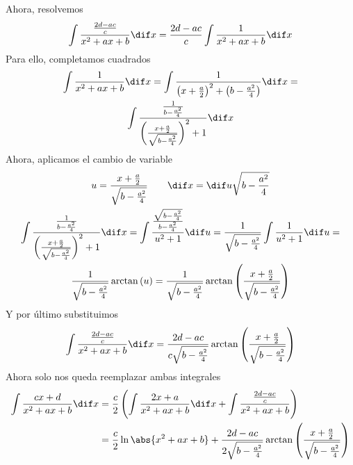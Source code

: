 \documentclass[a4paper]{article}
\begin{document}
Ahora, resolvemos
\[
    \int \frac{\frac{2d-ac}{c}}{x^2+ax+b} \dif x = \frac{2d-ac}{c} \int \frac{1}{x^2+ax+b} \dif x 
\]
Para ello, completamos cuadrados
\begin{gather*}
    \int \frac{1}{x^2+ax+b} \dif x = \int \frac{1}{\left( x + \frac{a}{2} \right)^2 + \left( b - \frac{a^2}{4} \right)} \dif x =\\
    \int \frac{\frac{1}{b - \frac{a^2}{4}}}{ \left( \frac{x + \frac{a}{2}}{ \sqrt{b - \frac{a^2}{4}}} \right)^2 + 1} \dif x
\end{gather*}
Ahora, aplicamos el cambio de variable
\begin{gather*}
    u = \frac{x + \frac{a}{2}}{\sqrt{b - \frac{a^2}{4}}} \qquad \dif x = \dif u \sqrt{b - \frac{a^2}{4}} \\
    \int \frac{\frac{1}{b - \frac{a^2}{4}}}{ \left( \frac{x + \frac{a}{2}}{ \sqrt{b - \frac{a^2}{4}}} \right)^2 + 1} \dif x = 
    \int \frac{\frac{\sqrt{b - \frac{a^2}{4}}}{b - \frac{a^2}{4}}}{u^2 + 1} \dif u = \frac{1}{\sqrt{b - \frac{a^2}{4}}} \int \frac{1}{u^2 + 1} \dif u = \\
    \frac{1}{\sqrt{b - \frac{a^2}{4}}} \arctan \left( u \right) = \frac{1}{\sqrt{b - \frac{a^2}{4}}} \arctan \left( \frac{x + \frac{a}{2}}{\sqrt{b - \frac{a^2}{4}}} \right)
\end{gather*}
Y por último substituimos
\[
    \int \frac{\frac{2d-ac}{c}}{x^2+ax+b} \dif x = \frac{2d-ac}{c\sqrt{b - \frac{a^2}{4}}} \arctan \left( \frac{x + \frac{a}{2}}{\sqrt{b - \frac{a^2}{4}}} \right)
\]
Ahora solo nos queda reemplazar ambas integrales
\[
\begin{aligned}
    \int \frac{cx+d}{x^2+ax+b} \dif x &= \frac{c}{2} \left( \int \frac{2x+a}{x^2+ax+b} \dif x + \int \frac{\frac{2d-ac}{c}}{x^2+ax+b} \right) \\
    &= \frac{c}{2} \ln \abs{x^2+ax+b}  + \frac{2d-ac}{2\sqrt{b-\frac{a^2}{4}}} \arctan \left( \frac{x + \frac{a}{2}}{\sqrt{b - \frac{a^2}{4}}} \right)
\end{aligned}
\]
\end{document}

